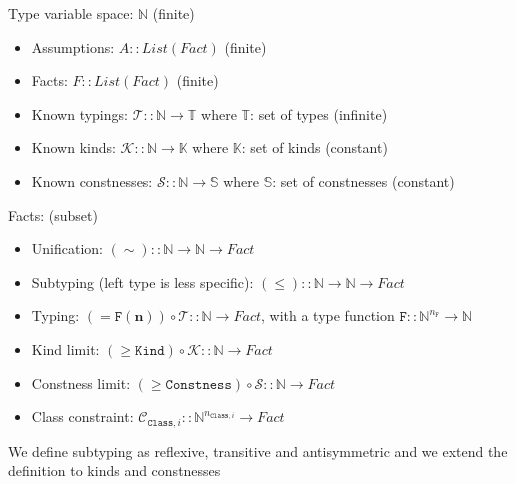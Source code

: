 \documentclass[12pt,a4paper]{article}
\begin{document}
Type variable space: $\mathbb{N}$ (finite)

\begin{itemize}
    \item Assumptions: $A :: List(Fact)$ (finite)
    \item Facts: $F :: List(Fact)$ (finite)
    \item Known typings: $\mathcal{T} :: \mathbb{N} \to \mathbb{T}$ where $\mathbb{T}$: set of types (infinite)
    \item Known kinds: $\mathcal{K} :: \mathbb{N} \to \mathbb{K}$ where $\mathbb{K}$: set of kinds (constant)
    \item Known constnesses: $\mathcal{S} :: \mathbb{N} \to \mathbb{S}$ where $\mathbb{S}$: set of constnesses (constant)
\end{itemize}

Facts: (subset)
\begin{itemize}
    \item Unification: $(\sim) :: \mathbb{N} \to \mathbb{N} \to Fact$
    \item Subtyping (left type is less specific): $(\leq) :: \mathbb{N} \to \mathbb{N} \to Fact$
    \item Typing: $(= \mathtt{F} (\mathbf{n})) \circ \mathcal{T} :: \mathbb{N} \to Fact$, with a type function $\mathtt{F} :: \mathbb{N}^{n_\mathtt{F}} \to \mathbb{N}$
    \item Kind limit: $(\geq \mathtt{Kind}) \circ \mathcal{K} :: \mathbb{N} \to Fact$
    \item Constness limit: $(\geq \mathtt{Constness}) \circ \mathcal{S} :: \mathbb{N} \to Fact$
    \item Class constraint: $\mathcal{C}_{\texttt{Class}, i} :: \mathbb{N}^{n_{\texttt{Class}, i}} \to Fact$
\end{itemize}

We define subtyping as reflexive, transitive and antisymmetric and we extend the definition to kinds and constnesses
\end{document}
